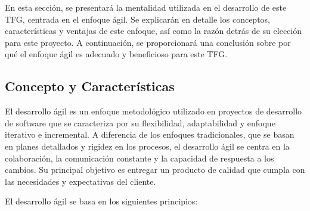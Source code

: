 En esta sección, se presentará la mentalidad utilizada en el desarrollo de este TFG, centrada en el enfoque ágil. Se explicarán en detalle los conceptos, características y ventajas de este enfoque, así como la razón detrás de su elección para este proyecto. A continuación, se proporcionará una conclusión sobre por qué el enfoque ágil es adecuado y beneficioso para este TFG.

\subsection{Concepto y Características}

El desarrollo ágil es un enfoque metodológico utilizado en proyectos de desarrollo de software que se caracteriza por su flexibilidad, adaptabilidad y enfoque iterativo e incremental. A diferencia de los enfoques tradicionales, que se basan en planes detallados y rigidez en los procesos, el desarrollo ágil se centra en la colaboración, la comunicación constante y la capacidad de respuesta a los cambios. Su principal objetivo es entregar un producto de calidad que cumpla con las necesidades y expectativas del cliente.

El desarrollo ágil se basa en los siguientes principios:

